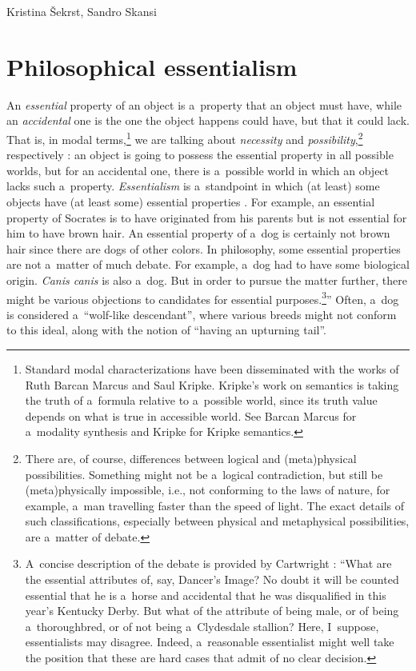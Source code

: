\begin{artengenv2auth}{Kristina Šekrst, Sandro Skansi}
\section{Philosophical essentialism}
An \textit{essential} property of an object is a~property that an object must have, while an \textit{accidental} one is the one the object happens could have, but that it could lack. That is, in modal terms,\footnote{Standard modal characterizations have been disseminated with the works of Ruth Barcan Marcus and Saul Kripke. Kripke's work on semantics is taking the truth of a~formula relative to a~possible world, since its truth value depends on what is true in accessible world. See Barcan Marcus
\parencite*[][]{marcus_modalities_1993} %
 for a~modality synthesis and Kripke 
\parencite*[][]{kripke_naming_1972} %
 for Kripke semantics.} we are talking about \textit{necessity} and \textit{possibility},\footnote{There are, of course, differences between logical and (meta)physical possibilities. Something might not be a~logical contradiction, but still be (meta)physically impossible, i.e., not conforming to the laws of nature, for example, a~man travelling faster than the speed of light. The exact details of such classifications, especially between physical and metaphysical possibilities, are a~matter of debate.} respectively 
\parencite[][]{robertson_ishii_essential_2020}: %
 an object is going to possess the essential property in all possible worlds, but for an accidental one, there is a~possible world in which an object lacks such a~property. \textit{Essentialism} is a~standpoint in which (at least) some objects have (at least some) essential properties 
\parencite[][]{robertson_ishii_essential_2020}. %
 For example, an essential property of Socrates is to have originated from his parents but is not essential for him to have brown hair. An essential property of a~dog is certainly not brown hair since there are dogs of other colors. In philosophy, some essential properties are not a~matter of much debate. For example, a~dog had to have some biological origin. \textit{Canis canis} is also a~dog. But in order to pursue the matter further, there might be various objections to candidates for essential purposes.\footnote{A~concise description of the debate is provided by Cartwright 
\parencite*[][p.615]{cartwright_remarks_1968}: %
 ``What are the essential attributes of, say, Dancer's Image? No doubt it will be counted essential that he is a~horse and accidental that he was disqualified in this year's Kentucky Derby. But what of the attribute of being male, or of being a~thoroughbred, or of not being a~Clydesdale stallion? Here, I~suppose, essentialists may disagree. Indeed, a~reasonable essentialist might well take the position that these are hard cases that admit of no clear decision.}'' Often, a~dog is considered a~``wolf-like descendant'', where various breeds might not conform to this ideal, along with the notion of ``having an upturning tail''.


\end{artengenv2auth}
